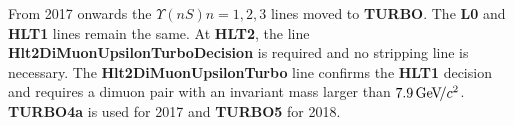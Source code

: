 From 2017 onwards the $\Upsilon(nS) n = 1,2,3$ lines moved to
\textbf{TURBO}. The  \textbf{L0} and \textbf{HLT1} lines remain the
same. At \textbf{HLT2}, the line
\textbf{Hlt2DiMuonUpsilonTurboDecision} is required and no stripping
line is necessary. The \textbf{Hlt2DiMuonUpsilonTurbo} line confirms
the \textbf{HLT1} decision and requires a dimuon pair with an invariant mass larger than $7.9
  \text{\,Ge\kern -0.1em V\!/}c^2$. \textbf{TURBO4a} is used for 2017 and \textbf{TURBO5} for 2018.

